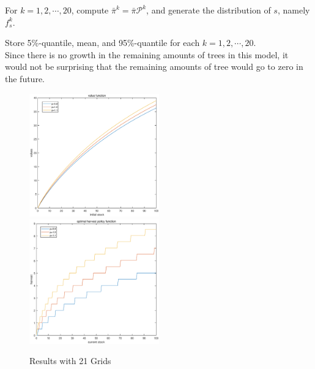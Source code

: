 \documentclass[10pt, letterpaper]{article}
\begin{document}
\noindent [3] For $k=1,2,\cdots,20$, compute $\bar{\pi}^{k}=\bar{\pi} {\mathcal P}^{k}$, and generate the distribution of $s$, namely $f_{s}^{k}$. 

\noindent [4] Store 5\%-quantile, mean, and 95\%-quantile for each $k=1,2,\cdots,20$.\\

 Since there is no growth in the remaining amounts of trees in this model, it would not be surprising that the remaining amounts of tree would go to zero in the future.
 
\begin{figure}
\includegraphics[width=0.5\textwidth]{value_grid21.eps}
\includegraphics[width=0.5\textwidth]{policy_grid21.eps}
\caption{Results with 21 Grids}
\end{figure}
\end{document}
